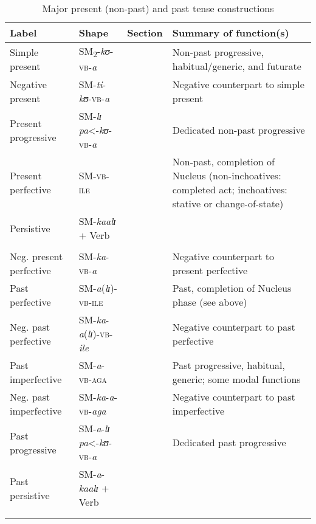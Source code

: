 \begin{sidewaystable}
\begin{tabularx}{\textwidth}{lllX}
\lsptoprule
\footnotesize{Label} & \footnotesize{Shape} &\footnotesize{Section} & \footnotesize{Summary of function(s)}\\
\midrule
Simple present & SM\textsubscript{2}-\textit{kʊ}-\textsc{vb}-\textit{a} &  & Non-past progressive, habitual/generic, and futurate\\
Negative present & SM-\textit{ti}-\textit{kʊ}-\textsc{vb}-\textit{a} &  & Negative counterpart to simple present\\
Present progressive & SM-\textit{lɪ} \textit{pa}<-\textit{kʊ}-\textsc{vb}-\textit{a} &  & Dedicated non-past progressive \\ 
Present perfective & SM-\textsc{vb}-\textsc{ile} &  & Non-past, completion of Nucleus (non-inchoatives: completed act; inchoatives: stative or change-of-state)\\
Persistive & SM-\textit{kaalɪ} + Verb &  & \\
& & & \\
Neg. present perfective & SM-\textit{ka}-\textsc{vb}-\textit{a} &  & Negative counterpart to present perfective\\
Past perfective & SM-\textit{a}(\textit{lɪ})-\textsc{vb}-\textsc{ile} &  & Past, completion of Nucleus phase (see above)\\
Neg. past perfective & SM-\textit{ka}-\textit{a}(\textit{lɪ})-\textsc{vb}-\textit{ile} &  & Negative counterpart to past perfective\\
Past imperfective & SM-\textit{a}-\textsc{vb}-\textsc{aga} &  & Past progressive, habitual, generic; some modal functions\\
Neg. past imperfective & SM-\textit{ka}-\textit{a}-\textsc{vb}-\textit{aga} &  & Negative counterpart to past imperfective\\
Past progressive & SM-\textit{a}-\textit{lɪ} \textit{pa}<-\textit{kʊ}-\textsc{vb}-\textit{a} &  & Dedicated past progressive \\ 
Past persistive & SM-\textit{a}-\textit{kaalɪ} + Verb &  & \\
& & &\\
\lspbottomrule
\end{tabularx}	
\caption{Major present (non-past) and past tense constructions}\label{tabAppendixPRSPST}
\end{sidewaystable}	


